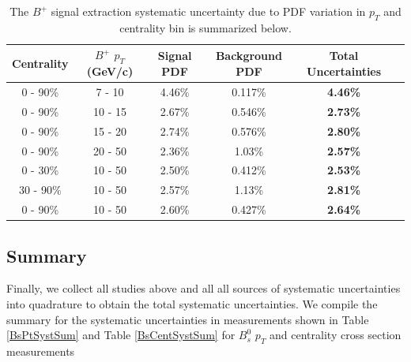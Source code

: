 \begin{table}[h]
\begin{center}
\caption{The $B^+$ signal extraction systematic uncertainty due to PDF variation in $p_T$ and centrality bin is summarized below.}
\vspace{1em}
\label{BPPDFVar}
  \begin{tabular}{| c | c |c | c| c| c| }
    \hline
     Centrality & $B^+$ $p_T$ (GeV/c) & Signal PDF & Background PDF  &  Total Uncertainties \\
    \hline
    \hline
0 - 90\% & 7 - 10 &   4.46\%  &  0.117\% & \textbf{4.46\%} \\ 
0 - 90\% & 10 - 15 & 2.67\%  & 0.546\%  & \textbf{2.73\%} \\ 
0 - 90\% & 15 - 20 &  2.74\% & 0.576\%   &  \textbf{2.80\%} \\ 
0 - 90\% & 20 - 50 &  2.36\%    & 1.03\%  &  \textbf{2.57\%} \\ 
0 - 30\% & 10 - 50  & 2.50\%  & 0.412\%  & \textbf{2.53\%}  \\ 
30 - 90\% & 10 - 50 &  2.57\% &   1.13\%  & \textbf{2.81\%} \\ 
0 - 90\% & 10 - 50 &  2.60\%   & 0.427\%  & \textbf{2.64\%} \\ 
    \hline
    \hline
\end{tabular}
\end{center}
\end{table}



\subsection{Summary}


Finally, we collect all studies above and all all sources of systematic uncertainties into quadrature to obtain the total systematic uncertainties. We compile the summary for the systematic uncertainties in measurements shown in Table \ref{BsPtSystSum} and Table \ref{BsCentSystSum} for $B^0_s$ $p_T$ and centrality cross section measurements

